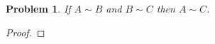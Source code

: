 \documentclass[12pt]{article}
\newtheorem{problem}{Problem}
\begin{document}
\begin{problem} %
If $A\sim B$ and $B\sim C$ then $A\sim C$.
\end{problem}


\begin{proof}
\end{proof}
\end{document}
